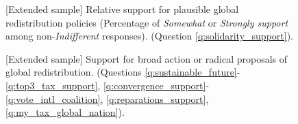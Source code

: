 \begin{figure}[h!]
\begin{subfigure}{.49\textwidth}
\end{subfigure}
\end{figure}

\begin{figure}[h!]
    \caption[{[}Extended sample{]} Relative support for plausible global policies]{[Extended sample] Relative support for plausible global redistribution policies (Percentage of \textit{Somewhat} or \textit{Strongly support} among non-\textit{Indifferent} responses). (Question \ref{q:solidarity_support}).
    }\label{fig:solidarity_support_share_extended}
\end{figure}
\begin{figure}[h!]
    \caption[{[}Extended sample{]} Support for broad or radical global redistribution]{[Extended sample] Support for broad action or radical proposals of global redistribution. \hfill (Questions \ref{q:sustainable_future}-\ref{q:top3_tax_support}, \ref{q:convergence_support}-\ref{q:vote_intl_coalition}, \ref{q:reparations_support}, \ref{q:my_tax_global_nation}).
    }\label{fig:radical_redistr_share_extended} 
\end{figure}

